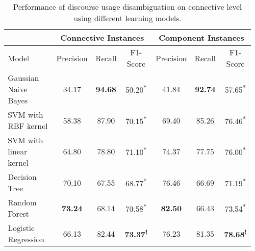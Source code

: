 \begin{table}[ht]
\centering
\begin{tabular}{|l|c|c|c|c|c|c|}
\hline
                        & \multicolumn{3}{c|}{Connective Instances}                 & \multicolumn{3}{c|}{Component Instances}                  \\ \hline
Model                   &     Precision &     Recall &     F1-Score                 &     Precision &     Recall &     F1-Score                 \\ \hline
Gaussian Naive Bayes    &     34.17     & \bf 94.68  &     50.20\textsuperscript{*} &     41.84     & \bf 92.74  &     57.65\textsuperscript{*} \\ \hline
SVM with RBF kernel     &     58.38     &     87.90  &     70.15\textsuperscript{*} &     69.40     &     85.26  &     76.46\textsuperscript{*} \\ \hline
SVM with linear kernel  &     64.80     &     78.80  &     71.10\textsuperscript{*} &     74.37     &     77.75  &     76.00\textsuperscript{*} \\ \hline
Decision Tree           &     70.10     &     67.55  &     68.77\textsuperscript{*} &     76.46     &     66.69  &     71.19\textsuperscript{*} \\ \hline
Random Forest           & \bf 73.24     &     68.14  &     70.58\textsuperscript{*} & \bf 82.50     &     66.43  &     73.54\textsuperscript{*} \\ \hline
Logistic Regression     &     66.13     &     82.44  & \bf 73.37\textsuperscript{!} &     76.23     &     81.35  & \bf 78.68\textsuperscript{!} \\ \hline

\end{tabular}
\caption{\label{t:recognition-connective-models} Performance of discourse usage
disambiguation on connective level using different learning models. }
\end{table}


